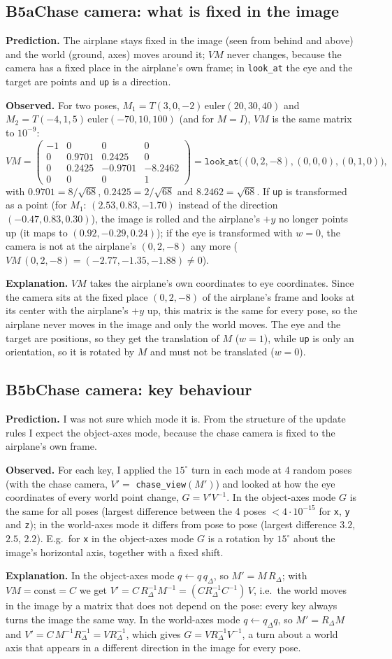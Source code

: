 \documentclass[10pt,a4paper]{article}
\newcommand{\experiment}[5]{%
  \subsection*{#1\quad #2}
  \textbf{Prediction.} #3\par
  \textbf{Observed.} #4\par
  \textbf{Explanation.} #5\par
}
\begin{document}
\experiment{B5a}{Chase camera: what is fixed in the image}
  {The airplane stays fixed in the image (seen from behind and above) and the world (ground, axes) moves around
   it; $VM$ never changes, because the camera has a fixed place in the airplane's own frame; in
   \texttt{look\_at} the eye and the target are points and \texttt{up} is a direction.}
  {For two poses, $M_1=T(3,0,-2)\,\mathrm{euler}(20,30,40)$ and $M_2=T(-4,1,5)\,\mathrm{euler}(-70,10,100)$
   (and for $M=I$), $V M$ is the same matrix to $10^{-9}$:
   \[
   VM=\begin{pmatrix}-1&0&0&0\\0&0.9701&0.2425&0\\0&0.2425&-0.9701&-8.2462\\0&0&0&1\end{pmatrix}
   =\texttt{look\_at}\big((0,2,-8),(0,0,0),(0,1,0)\big),
   \]
   with $0.9701=8/\sqrt{68}$, $0.2425=2/\sqrt{68}$ and $8.2462=\sqrt{68}$. If \texttt{up} is transformed as a point
   (for $M_1$: $(2.53,0.83,-1.70)$ instead of the direction $(-0.47,0.83,0.30)$), the image is rolled and the airplane's
   $+y$ no longer points up (it maps to $(0.92,-0.29,0.24)$); if the eye is transformed with $w=0$, the camera is not
   at the airplane's $(0,2,-8)$ any more ($VM\,(0,2,-8)=(-2.77,-1.35,-1.88)\ne0$).}
  {$VM$ takes the airplane's own coordinates to eye coordinates. Since the camera sits at the fixed place
   $(0,2,-8)$ of the airplane's frame and looks at its center with the airplane's $+y$ up, this matrix is the
   same for every pose, so the airplane never moves in the image and only the world moves. The eye and the target
   are positions, so they get the translation of $M$ ($w=1$), while \texttt{up} is only an orientation, so
   it is rotated by $M$ and must not be translated ($w=0$).}

\experiment{B5b}{Chase camera: key behaviour}
  {I was not sure which mode it is. From the structure of the update rules I expect the object-axes mode, because the
   chase camera is fixed to the airplane's own frame.}
  {For each key, I applied the $15^\circ$ turn in each mode at 4 random poses (with the chase camera, $V'=$
   \texttt{chase\_view}$(M')$) and looked at how the eye coordinates of every world point change,
   $G=V'V^{-1}$. In the object-axes mode $G$ is the same for all poses (largest difference between the 4 poses
   $<4\cdot10^{-15}$ for \texttt{x}, \texttt{y} and \texttt{z}); in the world-axes mode it differs from pose to pose
   (largest difference $3.2$, $2.5$, $2.2$). E.g.\ for \texttt{x} in the object-axes mode $G$ is a rotation by
   $15^\circ$ about the image's horizontal axis, together with a fixed shift.}
  {In the object-axes mode $q\leftarrow q\,q_\Delta$, so $M'=M\,R_\Delta$; with $VM=\mathrm{const}=C$ we get
   $V'=C\,R_\Delta^{-1}M^{-1}=(C R_\Delta^{-1}C^{-1})\,V$, i.e.\ the world moves in the image by a matrix that does not
   depend on the pose: every key always turns the image the same way. In the world-axes mode $q\leftarrow q_\Delta q$,
   so $M'=R_\Delta M$ and $V'=C\,M^{-1}R_\Delta^{-1}=V R_\Delta^{-1}$, which gives $G=V R_\Delta^{-1}V^{-1}$, a turn about
   a world axis that appears in a different direction in the image for every pose.}
\end{document}
